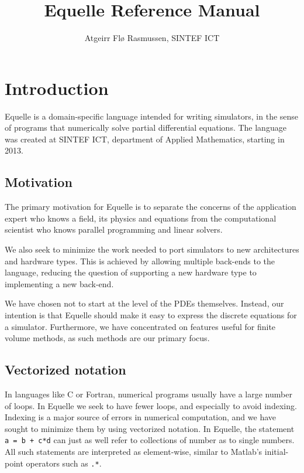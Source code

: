 \documentclass[11pt]{article}
\title{Equelle Reference Manual}
\author{Atgeirr Fl{\o} Rasmussen, SINTEF ICT}
\newcommand{\code}[1]{\texttt{#1}}
\begin{document}
\maketitle


\section{Introduction}

Equelle is a domain-specific language intended for writing simulators, in the sense of
programs that numerically solve partial differential equations. The language was created
at SINTEF ICT, department of Applied Mathematics, starting in 2013.

\subsection{Motivation}

The primary motivation for Equelle is to separate the concerns of the application expert
who knows a field, its physics and equations from the computational scientist who knows
parallel programming and linear solvers.

We also seek to minimize the work needed to port simulators to new architectures and
hardware types. This is achieved by allowing multiple back-ends to the language, reducing
the question of supporting a new hardware type to implementing a new back-end.

We have chosen not to start at the level of the PDEs themselves. Instead, our intention is
that Equelle should make it easy to express the discrete equations for a simulator.
Furthermore, we have concentrated on features useful for finite volume methods, as such
methods are our primary focus.

\subsection{Vectorized notation}

In languages like C or Fortran, numerical programs usually have a large number of
loops. In Equelle we seek to have fewer loops, and especially to avoid indexing. Indexing
is a major source of errors in numerical computation, and we have sought to minimize them
by using vectorized notation. In Equelle, the statement \code{a = b + c*d} can just as
well refer to collections of number as to single numbers. All such statements are
interpreted as element-wise, similar to Matlab's initial-point operators such as
\code{.*}.
\end{document}
